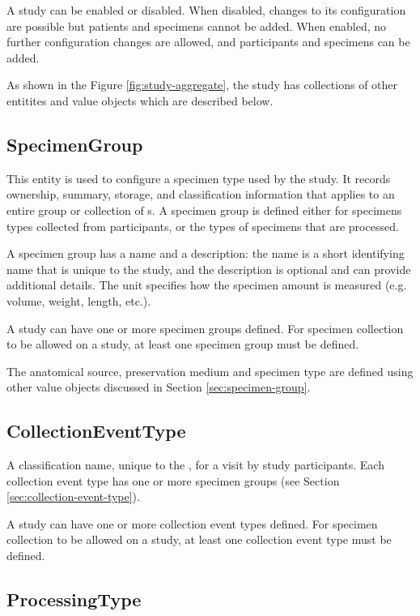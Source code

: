 A study can be enabled or disabled. When disabled, changes to its configuration
are possible but patients and specimens cannot be added. When enabled, no
further configuration changes are allowed, and participants and specimens can
be added.

As shown in the Figure \ref{fig:study-aggregate}, the study has collections of
other entitites and value objects which are described below.

\subsection*{SpecimenGroup}

This entity is used to configure a specimen type used by the study.  It
records ownership, summary, storage, and classification information that
applies to an entire group or collection of s. A specimen
group is defined either for specimens types collected from participants, or the
types of specimens that are processed.

A specimen group has a name and a description: the name is a short identifying
name that is unique to the study, and the description is optional and can
provide additional details. The unit specifies how the specimen amount is
measured (e.g. volume, weight, length, etc.).

A study can have one or more specimen groups defined.  For specimen collection
to be allowed on a study, at least one specimen group must be defined.

The anatomical source, preservation medium and specimen type are defined using
other value objects discussed in Section \ref{sec:specimen-group}.

\subsection*{CollectionEventType}

A classification name, unique to the , for a visit by study
participants. Each collection event type has one or more specimen groups (see
Section \ref{sec:collection-event-type}).

A study can have one or more collection event types defined. For specimen
collection to be allowed on a study, at least one collection event type must be
defined.

\subsection*{ProcessingType}

